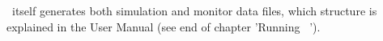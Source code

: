 %
%

\MCX\ itself generates both simulation and monitor data files, which structure is explained in the User Manual (see end of chapter 'Running \MCX\ ').


